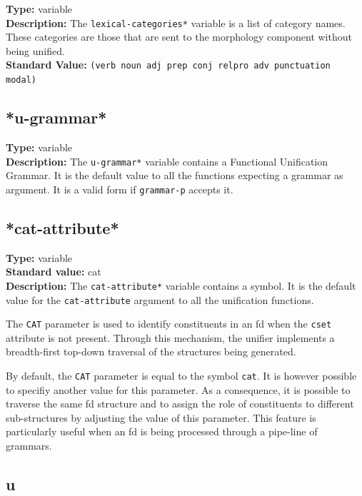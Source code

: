 \documentclass[10pt,a4paper]{report}
\begin{document}
{\bf Type:} variable
\\{\bf Description:} The {\tt *lexical-categories*} variable is a list of
category names. These categories are those that are sent to the
morphology component without being unified. 
\\{\bf Standard Value:} {\tt (verb noun adj prep conj relpro adv punctuation modal)}



\subsection{*u-grammar*}

{\bf Type:} variable
\\{\bf Description:} The {\tt *u-grammar*} variable contains a Functional
Unification Grammar. It is the default value to all the functions
expecting a grammar as argument. It is a valid form if
{\tt grammar-p} accepts it.

\subsection{*cat-attribute*}

{\bf Type:} variable
\\{\bf Standard value:} cat
\\{\bf Description:} The {\tt *cat-attribute*} variable contains a symbol.
It is the default value for the {\tt cat-attribute} argument to all the
unification functions.  

The {\tt CAT} parameter is used to identify constituents in an fd when the
{\tt cset} attribute is not present.  Through this mechanism, the unifier
implements a breadth-first top-down traversal of the structures being
generated.  

By default, the {\tt CAT} parameter is equal to the symbol {\tt cat}.  It is
however possible to specifiy another value for this parameter.  As a
consequence, it is possible to traverse the same fd structure and to assign
the role of constituents to different sub-structures by adjusting the value
of this parameter.  This feature is particularly useful when an fd is being
processed through a pipe-line of grammars.


\subsection{u}
\label{limit}
\end{document}
